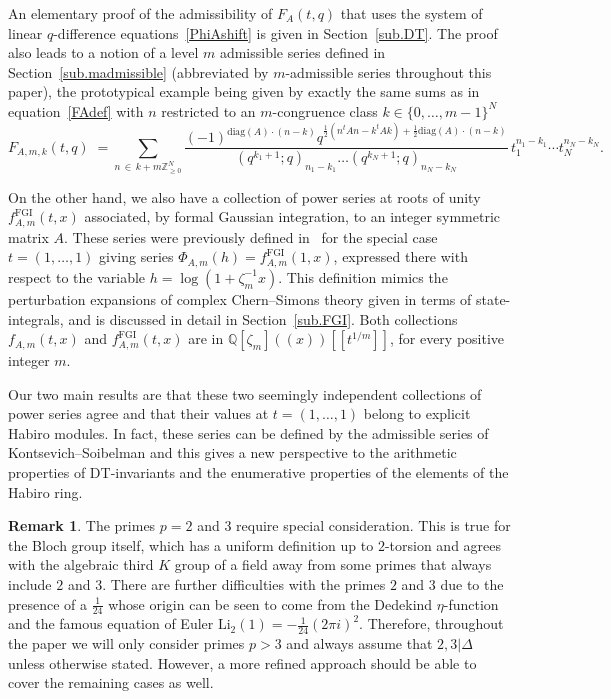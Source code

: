 \documentclass[12pt,reqno]{amsart}
\theoremstyle{definition}
\newtheorem{remark}[proposition]{Remark}
\def\BZ{\mathbb Z}
\def\BQ{\mathbb Q}
\def\Li{\mathrm{Li}}
\def\be{\begin{equation}}
\def\ee{\end{equation}}
\def\z{\zeta}
\def\FGI{\mathrm{FGI}}
\def\Phitof{f}
\begin{document}
An elementary proof of the admissibility of $F_A(t,q)$ that uses the system of linear
\hbox{$q$-difference} equations~\eqref{PhiAshift} is given in Section~\ref{sub.DT}.
The proof also leads to a notion of a level $m$ admissible series defined in
Section~\ref{sub.madmissible} (abbreviated by $m$-admissible series throughout
this paper), the prototypical example being given by exactly the same sums as in
equation~\eqref{FAdef} with $n$ restricted to an $m$-congruence class
$k\in\{0,\dots,m-1\}^N$
\be
\label{FAmdef}
F_{A,m,k}(t,q) \;=\!\!\!\!
\sum_{n \,\in\, k+m\BZ^N_{\ge0}}\!\!\!\!\!\! \frac{
(-1)^{\mathrm{diag}(A)\cdot (n-k)}
q^{\frac{1}{2}(n^t A n-k^t A k)
  +\frac{1}{2}\mathrm{diag}(A)\cdot (n-k)} }{(q^{k_1+1};q)_{n_1-k_1}
\dots (q^{k_N+1};q)_{n_N-k_{N}}}\,t_1^{n_1-k_1}\!\!\cdots
t_N^{n_N-k_N}\!\!.
\ee

On the other hand, we also have a collection of power series at roots of unity
$\Phitof^\FGI_{A,m}(t,x)$ associated, by formal Gaussian integration, to an integer
symmetric matrix $A$. These series were previously defined
in~\cite{Zagier:dilog,DG,DG2} for the special case $t=(1,\dots,1)$ giving series
$\Phi_{A,m}(h)=\Phitof^\FGI_{A,m}(1,x)$, expressed there with respect to the
variable $h=\log(1+\z_m^{-1}x)$. This definition mimics the perturbation
expansions of complex Chern--Simons theory given in terms of state-integrals, and is
discussed in detail in Section~\ref{sub.FGI}.
Both collections $\Phitof_{A,m}(t,x)$ and $\Phitof^\FGI_{A,m}(t,x)$ are
in $\BQ[\z_m](\!(x)\!)[\![t^{1/m}]\!]$, for every positive integer $m$. 

Our two main results are that these two seemingly independent collections of
power series agree and that their values at $t=(1,\dots,1)$ belong to explicit
Habiro modules. In fact, these series
can be defined by the admissible series of Kontsevich--Soibelman and this gives
a new perspective to the arithmetic properties of DT-invariants and the
enumerative properties of the elements of the Habiro ring.

\begin{remark}
\label{rem:coprimeto6}
The primes $p=2$ and $3$ require special consideration. This is true for the
Bloch group itself, which has a uniform definition up to $2$-torsion and agrees
with the algebraic third $K$ group of a field away from some primes that always
include $2$ and $3$. There are further difficulties with the primes $2$ and $3$
due to the presence of a $\tfrac{1}{24}$ whose origin can be seen to
come from the Dedekind $\eta$-function and the famous equation of Euler
$\Li_{2}(1)=-\tfrac{1}{24}(2\pi i)^2$. Therefore, throughout the paper we will
only consider primes $p>3$ and always assume that $2,3|\Delta$ unless otherwise
stated. However, a more refined approach should be able to cover the remaining cases
as well.
\end{remark}
\end{document}
